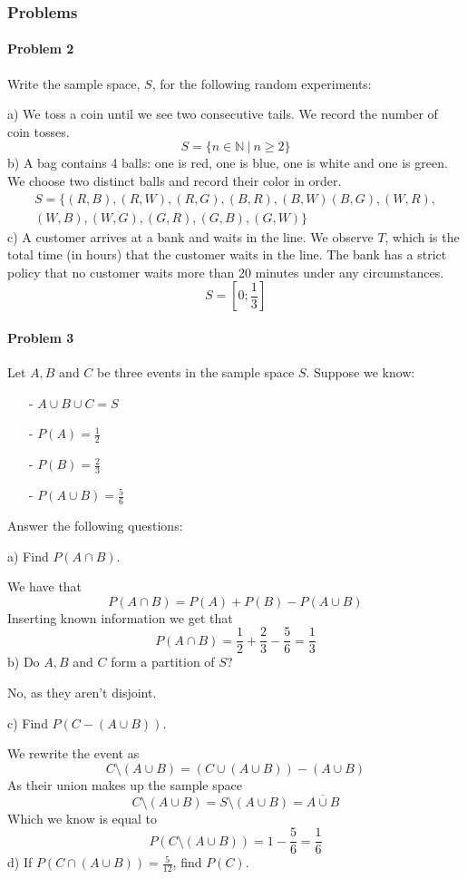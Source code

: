 \subsubsection{Problems}
\paragraph{Problem 2}
Write the sample space, $S$, for the following random experiments:

a) We toss a coin until we see two consecutive tails. We record the number of coin tosses.
\[
    S= \{n\in \mathbb{N}~|~n\geq 2\}
\]
b) A bag contains 4 balls: one is red, one is blue, one is white and one is green. We choose two distinct balls and record their color in order.
\begin{equation*}
    \begin{gathered}
        S=\{(R,B),(R,W),(R,G),(B,R),(B,W)(B,G),(W,R), \\
        (W,B),(W,G),(G,R),(G,B),(G,W)\}
    \end{gathered}
\end{equation*}
c) A customer arrives at a bank and waits in the line. We observe $T$, which is the total time (in hours) that the customer waits in the line. The bank has a strict policy that no customer waits more than 20 minutes under any circumstances.
\[
S=\left[0;\frac{1}{3}\right]
\]
\paragraph{Problem 3}
Let $A,B$ and $C$ be three events in the sample space $S$. Suppose we know:
\begin{itemize}
    \item[-] $A\cup B \cup C=S$
    \item[-] $P(A)=\frac{1}{2}$
    \item[-] $P(B)=\frac{2}{3}$
    \item[-] $P(A\cup B)=\frac{5}{6}$
\end{itemize}
Answer the following questions:

a) Find $P(A\cap B)$.

We have that
\[
    P(A\cap B)=P(A)+P(B)-P(A\cup B)
\]
Inserting known information we get that
\[
    P(A\cap B)=\frac{1}{2}+\frac{2}{3}-\frac{5}{6}=\frac{1}{3}
\]
b) Do $A,B$ and $C$ form a partition of $S$?

No, as they aren't disjoint.

c) Find $P(C-(A\cup B))$.

We rewrite the event as
\[
    C\setminus (A\cup B)=(C\cup (A\cup B))-(A\cup B)
\]
As their union makes up the sample space
\[
    C\setminus (A\cup B)=S\setminus (A\cup B)=\overline{A\cup B}
\]
Which we know is equal to
\[
    P(C\setminus (A\cup B))=1-\frac{5}{6}=\frac{1}{6}
\]
d) If $P(C\cap (A\cup B))=\frac{5}{12}$, find $P(C)$.

